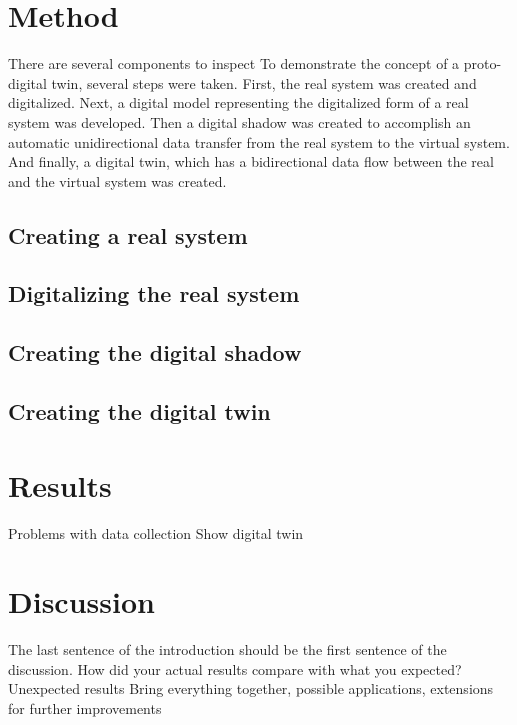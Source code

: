 \documentclass[conference]{IEEEtran}
\begin{document}
    \section{Method}\label{section:components}
    There are several components to inspect
    To demonstrate the concept of a proto-digital twin, several steps were taken. 
    First, the real system was created and digitalized. Next, a digital model representing the digitalized form of 
    a real system was developed. Then a digital shadow was created to accomplish an automatic unidirectional data transfer from the real system to the virtual system. 
    And finally, a digital twin, which has a bidirectional data flow between the real and the virtual system was created. 

    \subsection{Creating a real system}\label{section:real_system}
    \subsection{Digitalizing the real system}\label{section:digitalizing}
    \subsection{Creating the digital shadow}\label{section:digital_shadow}
    \subsection{Creating the digital twin}\label{section:digital_twin}
    \section{Results}\label{section:results}
    Problems with data collection
    Show digital twin
    \section{Discussion}\label{section:discussion}
    The last sentence of the introduction should be the first sentence of the discussion.
    How did your actual results compare with what you expected?
    Unexpected results
    Bring everything together, possible applications, extensions for further improvements
    
    
    
\end{document}
